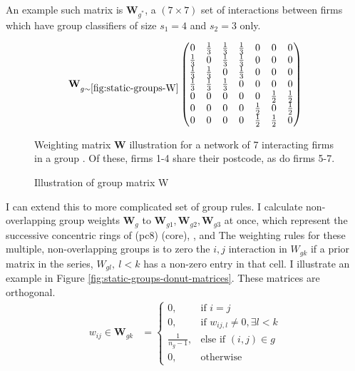 \par\noindent
An example such matrix is $\mathbf W_{g^*}$, a $(7\times 7)$
set of interactions between firms which have group classifiers of size $s_1=4$ and $s_2=3$ only.

\begin{figure}[hbtp]
    \caption{Illustration of group matrix W}
    \label{fig:static-groups-W}
    \centering
    \par\noindent
    \begin{align*}
        \mathbf{W}_{g\sim \ref{fig:static-groups-W}}
        \begin{pmatrix}
            0           & \frac{1}{3} & \frac{1}{3} & \frac{1}{3} & 0           & 0           & 0           \\
            \frac{1}{3} & 0           & \frac{1}{3} & \frac{1}{3} & 0           & 0           & 0           \\
            \frac{1}{3} & \frac{1}{3} & 0           & \frac{1}{3} & 0           & 0           & 0           \\
            \frac{1}{3} & \frac{1}{3} & \frac{1}{3} & 0           & 0           & 0           & 0           \\
            0           & 0           & 0           & 0           & 0           & \frac{1}{2} & \frac{1}{2} \\
            0           & 0           & 0           & 0           & \frac{1}{2} & 0           & \frac{1}{2} \\
            0           & 0           & 0           & 0           & \frac{1}{2} & \frac{1}{2} & 0           
        \end{pmatrix}
    \end{align*}
    \begin{tablenotes}
        Weighting matrix $\mathbf W$ illustration for a network of 7 interacting firms in a group .
        Of these, firms 1-4 share their postcode, as do firms 5-7.
    \end{tablenotes}
\end{figure}

I can extend this to more complicated set of group rules.
I calculate non-overlapping group weights $\mathbf W_g$ to $\mathbf W_{g1}, \mathbf W_{g2}, \mathbf W_{g3}$ at once,
which represent the successive concentric rings of \itx(pc8) (core), , and 
The weighting rules for these multiple, non-overlapping groups is to zero the $i,j$ interaction in
$W_{gk}$ if a prior matrix in the series, $W_{gl},\ l<k$ has a non-zero entry in that cell.
I illustrate an example in Figure \ref{fig:static-groups-donut-matrices}.
These matrices are orthogonal.
\begin{align*}
        w_{ij}\in \mathbf{W}_{gk} &=
        \begin{cases}
            0,             & \text{if } i=j \\
            0,             & \text{if } w_{ij,l} \neq 0, \exists l<k \\
            \frac{1}{n_g-1}, & \text{else if } (i,j)\in g \\
            0,             & \text{otherwise}
        \end{cases}
\end{align*}

